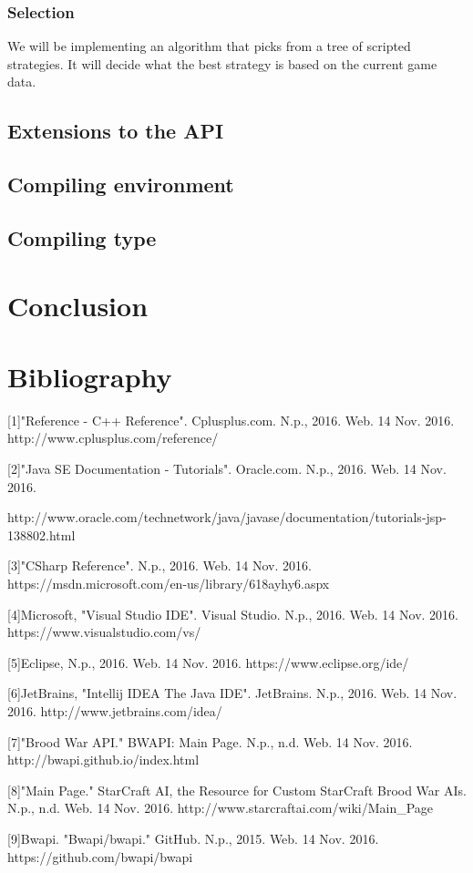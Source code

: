 \documentclass[10pt,letterpaper,onecolumn,draftclsnofoot]{IEEEtran}
\begin{document}
\subsubsection{Selection}
We will be implementing an algorithm that picks from a tree of scripted strategies. It will decide what the best strategy is based on the current game data.


\subsection{Extensions to the API}

\subsection{Compiling environment}

\subsection{Compiling type}

\section{Conclusion}

\newpage

\section{Bibliography}
[1]"Reference - C++ Reference". Cplusplus.com. N.p., 2016. Web. 14 Nov. 2016. http://www.cplusplus.com/reference/

[2]"Java SE Documentation - Tutorials". Oracle.com. N.p., 2016. Web. 14 Nov. 2016.

http://www.oracle.com/technetwork/java/javase/documentation/tutorials-jsp-138802.html

[3]"CSharp Reference". N.p., 2016. Web. 14 Nov. 2016. https://msdn.microsoft.com/en-us/library/618ayhy6.aspx

[4]Microsoft, "Visual Studio IDE". Visual Studio. N.p., 2016. Web. 14 Nov. 2016. https://www.visualstudio.com/vs/

[5]Eclipse, N.p., 2016. Web. 14 Nov. 2016. https://www.eclipse.org/ide/

[6]JetBrains, "Intellij IDEA The Java IDE". JetBrains. N.p., 2016. Web. 14 Nov. 2016. http://www.jetbrains.com/idea/

[7]"Brood War API." BWAPI: Main Page. N.p., n.d. Web. 14 Nov. 2016. http://bwapi.github.io/index.html

[8]"Main Page." StarCraft AI, the Resource for Custom StarCraft Brood War AIs. N.p., n.d. Web. 14 Nov. 2016. http://www.starcraftai.com/wiki/Main\_Page

[9]Bwapi. "Bwapi/bwapi." GitHub. N.p., 2015. Web. 14 Nov. 2016.  https://github.com/bwapi/bwapi
\end{document}
